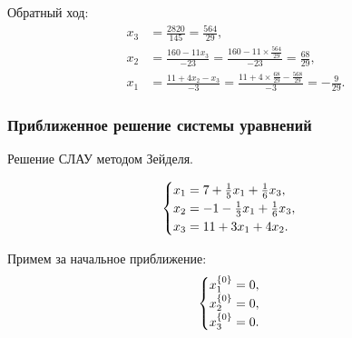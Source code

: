 \documentclass[10pt, a4paper, titlepage]{article}
\begin{document}
Обратный ход:
\begin{align*}
x_3 &= \frac{2820}{145}=\frac{564}{29}, \\
x_2 &= \frac{160-11x_3}{-23}=\frac{160-11\times\frac{564}{29}}{-23}=\frac{68}{29}, \\
x_1 &= \frac{11+4x_2-x_3}{-3}=\frac{11+4\times\frac{68}{29}-\frac{568}{29}}{-3}=-\frac{9}{29}.
\end{align*}

\subsubsection*{Приближенное решение системы уравнений}

Решение СЛАУ методом Зейделя.

\begin{equation*}
    \begin{cases}
        $$x_1=7+\frac{1}{5}x_1+\frac{1}{6}x_3$$, \\
        $$x_2=-1-\frac{1}{3}x_1+\frac{1}{6}x_3$$, \\
        $$x_3=11+3x_1+4x_2$$.
    \end{cases}
\end{equation*}

Примем за начальное приближение:
\begin{equation*}
    \begin{cases}
        $$x_1^{\{0\}}=0$$, \\
        $$x_2^{\{0\}}=0$$, \\
        $$x_3^{\{0\}}=0$$.
    \end{cases}
\end{equation*}
\end{document}
